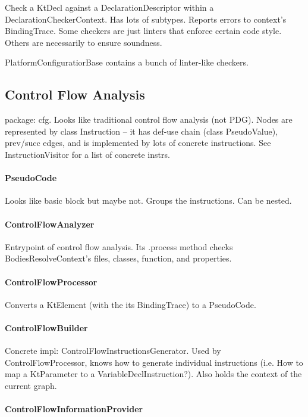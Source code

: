 \documentclass{article}
\begin{document}
Check a KtDecl against a DeclarationDescriptor within a DeclarationCheckerContext. Has lots of subtypes. Reports errors to context's BindingTrace. Some checkers are just linters that enforce certain code style. Others are necessarily to ensure soundness.

PlatformConfiguratiorBase contains a bunch of linter-like checkers.

\subsection{Control Flow Analysis}

package: cfg. Looks like traditional control flow analysis (not PDG). Nodes are represented by class Instruction -- it has def-use chain (class PseudoValue), prev/succ edges, and is implemented by lots of concrete instructions. See InstructionVisitor for a list of concrete instrs.

\paragraph{PseudoCode} Looks like basic block but maybe not. Groups the instructions. Can be nested.

\paragraph{ControlFlowAnalyzer}

Entrypoint of control flow analysis. Its .process method checks BodiesResolveContext's files, classes, function, and properties.

\paragraph{ControlFlowProcessor}

Converts a KtElement (with the its BindingTrace) to a PseudoCode.

\paragraph{ControlFlowBuilder}

Concrete impl: ControlFlowInstructionsGenerator. Used by ControlFlowProcessor, knows how to generate individual instructions (i.e. How to map a KtParameter to a VariableDeclInstruction?). Also holds the context of the current graph.

\paragraph{ControlFlowInformationProvider}
\end{document}
